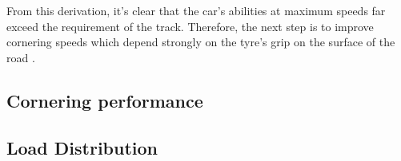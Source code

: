 From this derivation, it's clear that the car's abilities at maximum speeds far exceed the requirement of the track. Therefore, the next step is to improve cornering speeds which depend strongly on the tyre's grip on the surface of the road \cite{jkatz}.


\subsection{Cornering performance}
\subsection{Load Distribution}
